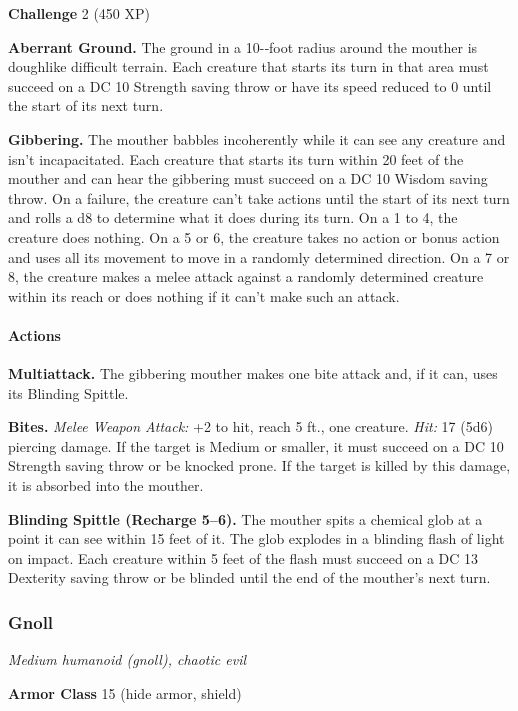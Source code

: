 \documentclass[
]{article}
\begin{document}
\textbf{Challenge} 2 (450 XP)

\textbf{Aberrant Ground.} The ground in a 10-­‐foot radius around the
mouther is doughlike difficult terrain. Each creature that starts its
turn in that area must succeed on a DC 10 Strength saving throw or have
its speed reduced to 0 until the start of its next turn.

\textbf{Gibbering.} The mouther babbles incoherently while it can see
any creature and isn't incapacitated. Each creature that starts its turn
within 20 feet of the mouther and can hear the gibbering must succeed on
a DC 10 Wisdom saving throw. On a failure, the creature can't take
actions until the start of its next turn and rolls a d8 to determine
what it does during its turn. On a 1 to 4, the creature does nothing. On
a 5 or 6, the creature takes no action or bonus action and uses all its
movement to move in a randomly determined direction. On a 7 or 8, the
creature makes a melee attack against a randomly determined creature
within its reach or does nothing if it can't make such an attack.

\hypertarget{actions-12}{%
\paragraph{Actions}\label{actions-12}}

\textbf{Multiattack.} The gibbering mouther makes one bite attack and,
if it can, uses its Blinding Spittle.

\textbf{Bites.} \emph{Melee Weapon Attack:} +2 to hit, reach 5 ft., one
creature. \emph{Hit:} 17 (5d6) piercing damage. If the target is Medium
or smaller, it must succeed on a DC 10 Strength saving throw or be
knocked prone. If the target is killed by this damage, it is absorbed
into the mouther.

\textbf{Blinding Spittle (Recharge 5--6).} The mouther spits a chemical
glob at a point it can see within 15 feet of it. The glob explodes in a
blinding flash of light on impact. Each creature within 5 feet of the
flash must succeed on a DC 13 Dexterity saving throw or be blinded until
the end of the mouther's next turn.

\hypertarget{gnoll}{%
\subsubsection{Gnoll}\label{gnoll}}

\emph{Medium humanoid (gnoll), chaotic evil}

\textbf{Armor Class} 15 (hide armor, shield)
\end{document}
